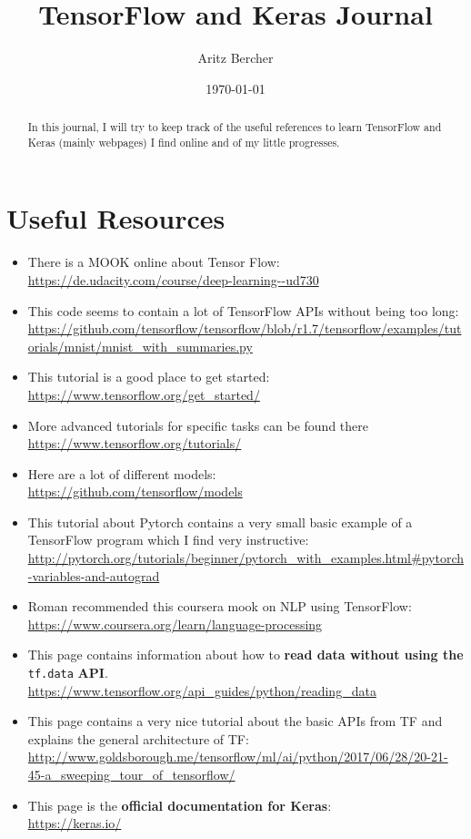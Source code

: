 \documentclass[11pt,a4paper]{article}
\title{TensorFlow and Keras Journal}
\author{Aritz Bercher}
\date{\today}
\begin{document}
\maketitle

\tableofcontents

\begin{abstract}
In this journal, I will try to keep track of the useful references to learn TensorFlow and Keras (mainly webpages) I find online and of my little progresses.
\end{abstract}

\section{Useful Resources}
\begin{itemize}
\item There is a MOOK online about Tensor Flow:\\
\url{https://de.udacity.com/course/deep-learning--ud730}
\item This code seems to contain a lot of TensorFlow APIs without being too long:\\
\url{https://github.com/tensorflow/tensorflow/blob/r1.7/tensorflow/examples/tutorials/mnist/mnist_with_summaries.py}
\item This tutorial is a good place to get started:\\
\url{https://www.tensorflow.org/get_started/}
\item More advanced tutorials for specific tasks can be found there
\url{https://www.tensorflow.org/tutorials/}\\
\item Here are a lot of different models:\\
\url{https://github.com/tensorflow/models}\\
\item This tutorial about Pytorch contains a very small basic example of a TensorFlow program which I find very instructive:\\
\url{http://pytorch.org/tutorials/beginner/pytorch_with_examples.html#pytorch-variables-and-autograd}
\item Roman recommended this coursera mook on NLP using TensorFlow:\\
\url{https://www.coursera.org/learn/language-processing}\\
\item This page contains information about how to \textbf{read data without using the} \texttt{tf.data} \textbf{API}.\\
\url{https://www.tensorflow.org/api_guides/python/reading_data}\\
\item This page contains a very nice tutorial about the basic APIs from TF and explains the general architecture of TF:\\
\url{http://www.goldsborough.me/tensorflow/ml/ai/python/2017/06/28/20-21-45-a_sweeping_tour_of_tensorflow/}\\
\item This page is the \textbf{official documentation for Keras}:\\
\url{https://keras.io/}
\end{itemize}
\end{document}
